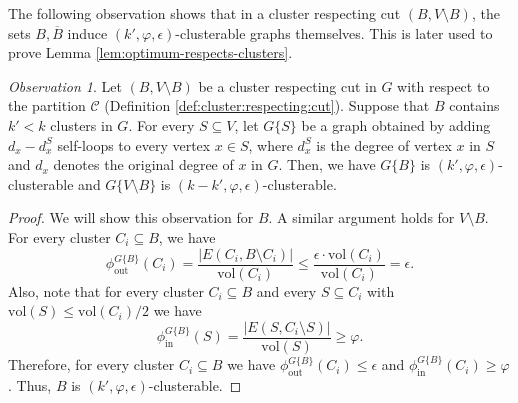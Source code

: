 \documentclass[letterpaper,11pt]{article}
\newcommand{\cC}{\mathcal{C}}
\theoremstyle{plain}
\theoremstyle{definition}
\theoremstyle{remark}
\newtheorem{observation}{Observation}
\newcommand{\e}{\epsilon}
\newcommand{\vol}{\text{vol}}
\begin{document}
The following observation shows that in a cluster respecting cut $(B, V\setminus B)$, the sets $B, \overline{B}$ induce $(k', \varphi, \e)$-clusterable graphs themselves. This is later used to prove Lemma 
\ref{lem:optimum-respects-clusters}.

\begin{observation} \label{obs:inherit}
	 Let $(B, V\setminus B)$ be a cluster 
	respecting cut in $G$  with respect to the partition $\cC$ (Definition \ref{def:cluster:respecting:cut}). Suppose that $B$ contains 
	$k' < k$ clusters in $G$.  For every $S\subseteq V$, let $G\{S\}$ be a graph obtained by adding  $d_x - d^S_x$ self-loops to every 
	vertex $x\in S$, where $d^S_x$ is the degree of vertex $x$ in $S$ and $d_x$ denotes the original degree of $x$ in $G$. Then, 
	we have $G\{B\}$ is $(k', \varphi, \e)$-clusterable and $G\{V\setminus B\}$ is $(k-k', \varphi, \e)$-clusterable.
\end{observation}
\begin{proof}
	We will show this observation for $B$. A similar argument holds for $V \setminus B$.
	For every cluster $C_i \subseteq B$, we have
	\[\phi^{G\{B\}}_{\text{out}}(C_i) = \frac{|E(C_i, B \setminus C_i)|}{\vol(C_i)} \leq \frac{\e\cdot \vol(C_i)}{\vol(C_i)} = \e\text{.}\]
	Also, note that for every cluster  $C_i \subseteq B$ and every $S \subseteq C_i$ with $\vol(S) \leq \vol(C_i)/2$ we have
	\[\phi^{G\{B\}}_{\text{in}}(S) = \frac{|E(S, C_i \setminus S)|}{\vol(S)} \geq \varphi \text{.}\]
	Therefore, for every cluster $C_i \subseteq B$ we have $\phi^{G\{B\}}_{\text{out}}(C_i)\leq \e$ and 
	$\phi^{G\{B\}}_{\text{in}}(C_i)\geq \varphi$. Thus, $B$ is $(k', \varphi, \e)$-clusterable.
\end{proof}
\end{document}
